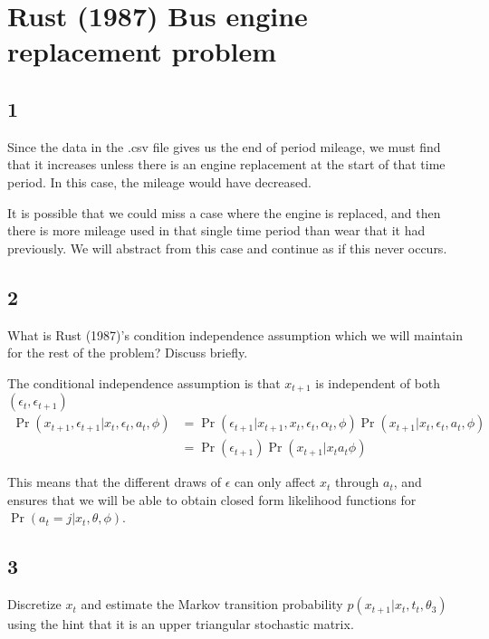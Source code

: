 \documentclass{paper}
\begin{document}
\section{Rust (1987) Bus engine replacement problem}

\subsection{1}

Since the data in the .csv file gives us the end of period mileage, we
must find that it increases unless there is an engine replacement at
the start of that time period. In this case, the mileage would have
decreased.

It is possible that we could miss a case where the engine is replaced,
and then there is more mileage used in that single time period than
wear that it had previously. We will abstract from this case and
continue as if this never occurs.

\subsection{2}

What is Rust (1987)'s condition independence assumption which we will
maintain for the rest of the problem? Discuss briefly.
\vspace{.3in}

The conditional independence assumption is that $x_{t+1}$ is independent
of both $(\epsilon_t, \epsilon_{t+1})$
\begin{align*}
  \Pr( x_{t+1},\epsilon_{t+1} \vert x_t, \epsilon_t, a_t, \phi ) &= \Pr( \epsilon_{t+1} \vert
                                              x_{t+1},x_t, \epsilon_t, \alpha_t,
                                              \phi) \Pr( x_{t+1} \vert x_t,
                                              \epsilon_t, a_t, \phi)\\
  &= \Pr( \epsilon_{t+1}) \Pr( x_{t+1} \vert x_t a_t \phi)
\end{align*}

This means that the different draws of $\epsilon$ can only affect $x_t$
through $a_t$, and ensures that we will be able to obtain closed form
likelihood functions for $\Pr( a_t = j \vert x_t, \theta, \phi)$.

\subsection{3}

Discretize $x_t$ and estimate the Markov transition probability
$p(x_{t+1} \vert x_t, t_t, \theta_3)$ using the hint that it is an upper
triangular stochastic matrix.
\end{document}
